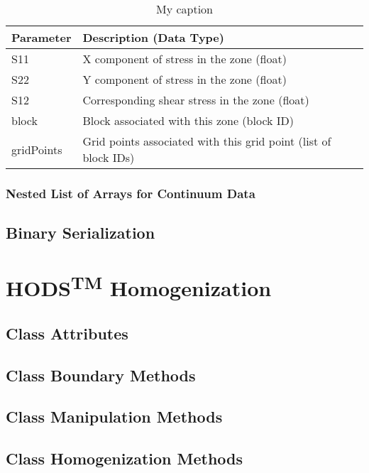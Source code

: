 \begin{table}[!htb]
\centering
\caption{{My caption}}
\label{tab6}
\begin{tabularx}{\textwidth}{@{}Yp{0.75\textwidth}@{}}
\toprule
\textbf{Parameter} & \textbf{Description (Data Type)}                                \\ \midrule
S11                & X component of stress in the zone (float)                       \\
S22                & Y component of stress in the zone (float)                       \\
S12                & Corresponding shear stress in the zone (float)                  \\
block              & Block associated with this zone (block ID)                      \\
gridPoints         & Grid points associated with this grid point (list of block IDs)\\ \bottomrule
\end{tabularx}
\end{table}




\subsubsection*{Nested List of Arrays for Continuum Data}




\subsection{Binary Serialization}




\section{HODS\textsuperscript{TM} Homogenization}
\subsection{Class Attributes}
\subsection{Class Boundary Methods}
\subsection{Class Manipulation Methods}
\subsection{Class Homogenization Methods}

